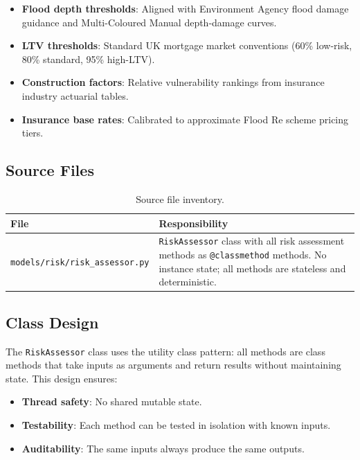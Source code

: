 \documentclass[11pt,a4paper]{article}
\begin{document}
\begin{itemize}
    \item \textbf{Flood depth thresholds}: Aligned with Environment Agency flood damage guidance and Multi-Coloured Manual depth-damage curves.
    \item \textbf{LTV thresholds}: Standard UK mortgage market conventions (60\% low-risk, 80\% standard, 95\% high-LTV).
    \item \textbf{Construction factors}: Relative vulnerability rankings from insurance industry actuarial tables.
    \item \textbf{Insurance base rates}: Calibrated to approximate Flood Re scheme pricing tiers.
\end{itemize}

\clearpage

\mkmimplementation

\subsection{Source Files}

\begin{table}[H]
\centering
\caption{Source file inventory.}
\label{tab:source_files}
\begin{tabular}{lp{10cm}}
\toprule
\textbf{File} & \textbf{Responsibility} \\
\midrule
\texttt{models/risk/risk\_assessor.py} & \texttt{RiskAssessor} class with all risk assessment methods as \texttt{@classmethod} methods. No instance state; all methods are stateless and deterministic. \\
\bottomrule
\end{tabular}
\end{table}

\subsection{Class Design}

The \texttt{RiskAssessor} class uses the utility class pattern: all methods are class methods that take inputs as arguments and return results without maintaining state. This design ensures:

\begin{itemize}
    \item \textbf{Thread safety}: No shared mutable state.
    \item \textbf{Testability}: Each method can be tested in isolation with known inputs.
    \item \textbf{Auditability}: The same inputs always produce the same outputs.
\end{itemize}
\end{document}
